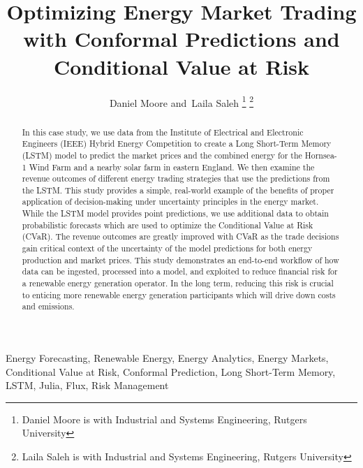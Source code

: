 \documentclass[
  journal,
]{IEEEtran}%
\title{Optimizing Energy Market Trading with Conformal Predictions and
Conditional Value at Risk}
\author{
Daniel Moore
and~Laila Saleh%
\thanks{Daniel Moore is with Industrial and Systems Engineering, Rutgers
University%
}
\thanks{Laila Saleh is with Industrial and Systems Engineering, Rutgers
University%
}
}
\begin{document}


\maketitle

\begin{abstract}
In this case study, we use data from the Institute of Electrical and
Electronic Engineers (IEEE) Hybrid Energy Competition to create a Long
Short-Term Memory (LSTM) model to predict the market prices and the
combined energy for the Hornsea-1 Wind Farm and a nearby solar farm in
eastern England. We then examine the revenue outcomes of different
energy trading strategies that use the predictions from the LSTM. This
study provides a simple, real-world example of the benefits of proper
application of decision-making under uncertainty principles in the
energy market. While the LSTM model provides point predictions, we use
additional data to obtain probabilistic forecasts which are used to
optimize the Conditional Value at Risk (CVaR). The revenue outcomes are
greatly improved with CVaR as the trade decisions gain critical context
of the uncertainty of the model predictions for both energy production
and market prices. This study demonstrates an end-to-end workflow of how
data can be ingested, processed into a model, and exploited to reduce
financial risk for a renewable energy generation operator. In the long
term, reducing this risk is crucial to enticing more renewable energy
generation participants which will drive down costs and emissions.
\end{abstract}
\begin{IEEEkeywords}
Energy Forecasting, Renewable Energy, Energy Analytics, Energy
Markets, Conditional Value at Risk, Conformal Prediction, Long
Short-Term Memory, LSTM, Julia, Flux, Risk Management
\end{IEEEkeywords}

%
\end{document}

